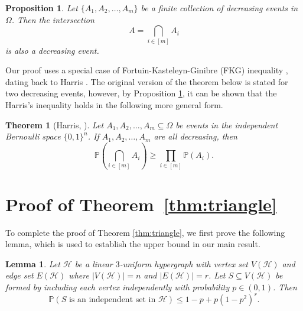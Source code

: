 \documentclass[11pt,a4paper]{article}
\newcommand{\cH}{\mathcal{H}}
\newtheorem{theorem}{Theorem}
\newtheorem{lemma}{Lemma}
\newtheorem{proposition}{Proposition}
\begin{document}
\begin{proposition}\label{prop}
Let $\{A_1,A_2,\ldots,A_m\}$ be a finite collection of decreasing events in $\Omega$. Then the intersection
\[
A = \bigcap_{i\in [m]} A_i
\]
is also a decreasing event.
\end{proposition}

Our proof uses a special case of  Fortuin-Kasteleyn-Ginibre (FKG) inequality \cite{For}, dating back to Harris \cite{Har}.  The original version of the theorem below is stated for two decreasing events, however, by Proposition \ref{prop}, it can be shown that the Harris's inequality \cite{Har} holds in the following more general form.

\begin{theorem}[Harris, \cite{Har}]\label{Har-ineq}
    Let $A_1, A_2,\ldots, A_m \subseteq \Omega$ be events in the independent Bernoulli space $\{0,1\}^n$.
    If $A_1,A_2,\ldots,A_m$  are all decreasing, then
    \[
    \mathbb{P}(\bigcap_{i\in [m]}A_i ) \geq \prod_{i\in [m]}\mathbb{P}(A_i).
    \]
\end{theorem}

\section{Proof of Theorem~\ref{thm:triangle}}

To complete the proof of Theorem \ref{thm:triangle}, we first prove the following lemma, which is used to establish the upper bound in our main result.

\begin{lemma}\label{lem:linear3}
Let $\cH$ be a linear $3$-uniform hypergraph with vertex set $V(\cH)$ and edge set $E(\cH)$ where $|V(\cH)| = n$ and $|E(\cH)| = r$. Let $S\subseteq V(\cH)$
be formed by including each vertex independently with probability $p\in(0,1)$. Then
$$
\mathbb P(S \text{ is an independent set in } \cH)\le 1-p+p(1-p^2)^r.
$$
\end{lemma}
\end{document}
